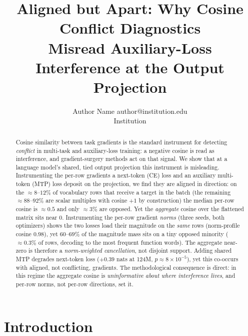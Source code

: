 \documentclass{article}
\title{Aligned but Apart: Why Cosine Conflict Diagnostics\\
Misread Auxiliary-Loss Interference at the Output Projection}
\author{\name Author Name \email author@institution.edu \\
  \addr Institution}
\begin{document}
\maketitle

\begin{abstract}
Cosine similarity between task gradients is the standard instrument for detecting
\emph{conflict} in multi-task and auxiliary-loss training: a negative cosine is
read as interference, and gradient-surgery methods act on that signal. We show
that at a language model's shared, tied output projection this instrument is
misleading. Instrumenting the per-row gradients a next-token (CE) loss and an
auxiliary multi-token (MTP) loss deposit on the projection, we find they are
aligned in direction: on the ${\approx}8$--$12\%$ of vocabulary rows that receive
a target in the batch (the remaining ${\approx}88$--$92\%$ are scalar multiples
with cosine $+1$ by construction) the median per-row cosine is ${\approx}0.5$ and
only ${\approx}3\%$ are opposed. Yet the \emph{aggregate} cosine over the
flattened matrix sits near $0$. Instrumenting the per-row gradient \emph{norms}
(three seeds, both optimizers) shows the two losses load their magnitude on the
\emph{same} rows (norm-profile cosine $0.98$), yet $60$--$69\%$ of the magnitude
mass sits on a tiny opposed minority (${\approx}0.3\%$ of rows, decoding to the
most frequent function words). The aggregate near-zero is therefore a
\emph{norm-weighted cancellation}, not disjoint support. Adding shared MTP
degrades next-token loss ($+0.39$ nats at 124M, $p{\approx}8{\times}10^{-5}$),
yet this co-occurs with aligned, not conflicting, gradients. The methodological
consequence is direct: in this regime the aggregate cosine is \emph{uninformative
about where interference lives}, and per-row norms, not per-row directions, set it.
\end{abstract}

\section{Introduction}
\label{sec:intro}
\end{document}
